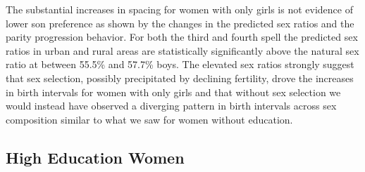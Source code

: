 \documentclass[12pt,letterpaper]{article}
\begin{document}
The substantial increases in spacing for women with only girls is not evidence of lower
son preference as shown by the changes in the predicted sex ratios and the parity 
progression behavior.
For both the third and fourth spell the predicted sex ratios in urban and rural areas are
statistically significantly above the natural sex ratio at between 55.5\% and 57.7\% boys.
The elevated sex ratios strongly suggest that sex selection, possibly precipitated by
declining fertility, drove the increases in birth intervals for women with only girls and 
that without sex selection we would instead have observed a diverging pattern in birth 
intervals across sex composition similar to what we saw for women without education.


\subsection{High Education Women}


\end{document}
